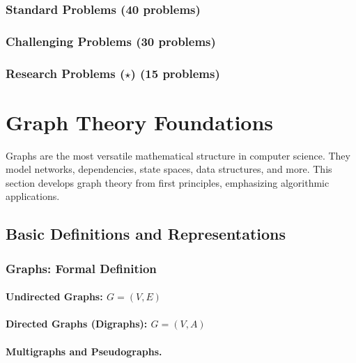 \subsubsection{Standard Problems (40 problems)}
\subsubsection{Challenging Problems (30 problems)}
\subsubsection{Research Problems ($\star$) (15 problems)}

\section{Graph Theory Foundations}
\label{sec:graph-theory}

\begin{sectionintro}
Graphs are the most versatile mathematical structure in computer science. They 
model networks, dependencies, state spaces, data structures, and more. This 
section develops graph theory from first principles, emphasizing algorithmic 
applications.
\end{sectionintro}

\subsection{Basic Definitions and Representations}
\label{subsec:graph-basics}

\subsubsection{Graphs: Formal Definition}
\paragraph{Undirected Graphs: $G = (V, E)$}
\paragraph{Directed Graphs (Digraphs): $G = (V, A)$}
\paragraph{Multigraphs and Pseudographs.}

